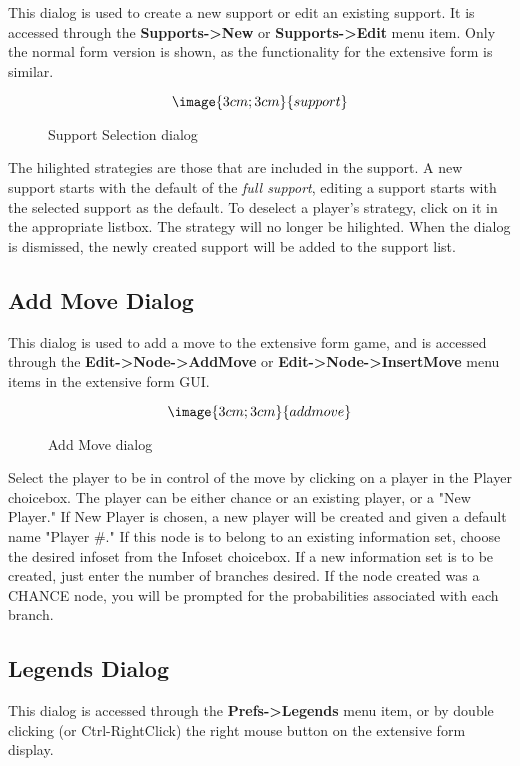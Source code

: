 This dialog is used to create a new support or edit an existing
support.  It is accessed through the {\bf Supports->New} or {\bf
Supports->Edit} menu item.  Only the normal form version is shown, as
the functionality for the extensive form is similar.

\begin{figure}
$$\image{3cm;3cm}{support}$$
\caption{Support Selection dialog}\label{fig_support}
\end{figure}

The hilighted strategies are those that are included in the support.
A new support starts with the default of the {\em full support},
editing a support starts with the selected support as the default.  To
deselect a player's strategy, click on it in the appropriate listbox.
The strategy will no longer be hilighted.  When the dialog is
dismissed, the newly created support will be added to the support
list.

\subsection{Add Move Dialog}\label{AddMove}

This dialog is used to add a move to the extensive form game, and is
accessed through the {\bf Edit->Node->AddMove} or {\bf 
Edit->Node->InsertMove} menu items in the extensive form GUI.  

\begin{figure}
$$\image{3cm;3cm}{addmove}$$
\caption{Add Move dialog}\label{fig_addmove}
\end{figure}

Select the player to be in control of the move by clicking on a player
in the Player choicebox.  The player can be either chance or an
existing player, or a "New Player."  If New Player is chosen, a new
player will be created and given a default name "Player \#."  If this
node is to belong to an existing information set, choose the desired
infoset from the Infoset choicebox.  If a new information set is to be
created, just enter the number of branches desired.  If the node
created was a CHANCE node, you will be prompted for the
probabilities associated with each branch.

\subsection{Legends Dialog}\label{Legends}

This dialog is accessed through the {\bf Prefs->Legends} menu item, or
by double clicking (or Ctrl-RightClick) the right mouse button on the
extensive form display.

